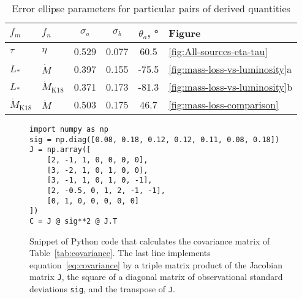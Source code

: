 \documentclass[useAMS, usenatbib, a4paper]{mnras}
\begin{document}
\begin{table}
  \centering
  \caption[Error ellipse]{Error ellipse parameters for particular pairs of derived quantities}
  \label{tab:error-ellipse}
  \begin{tabular}{l l S S S l}
    \toprule
    \(f_m\) & \(f_n\) &  {\(\sigma_a\)} & {\(\sigma_b\)}
    & {\(\theta_a\), \si{\degree}} & Figure   \\
    \midrule
    \(\tau\) & \(\eta\) & 0.529 & 0.077 & 60.5 & \ref{fig:All-sources-eta-tau} \\
    \(L_*\) & \(\dot M\) & 0.397 & 0.155 & -75.5 & \ref{fig:mass-loss-vs-luminosity}a \\
    \(L_*\) & \(\dot M_{\text{K18}}\) & 0.371 & 0.173 & -81.3 & \ref{fig:mass-loss-vs-luminosity}b \\
    \(\dot M_{\text{K18}}\) & \(\dot M\) & 0.503 & 0.175 & 46.7 & \ref{fig:mass-loss-comparison} \\
    \bottomrule
  \end{tabular}
\end{table}


\begin{figure}
  \centering
  \footnotesize
  \begin{verbatim}
import numpy as np
sig = np.diag([0.08, 0.18, 0.12, 0.12, 0.11, 0.08, 0.18])
J = np.array([
    [2, -1, 1, 0, 0, 0, 0],
    [3, -2, 1, 0, 1, 0, 0],
    [3, -1, 1, 0, 1, 0, -1],
    [2, -0.5, 0, 1, 2, -1, -1],
    [0, 1, 0, 0, 0, 0, 0]
])
C = J @ sig**2 @ J.T
  \end{verbatim}
  \vspace*{-\baselineskip}
  \caption{Snippet of Python code that calculates the
    covariance matrix of Table~\ref{tab:covariance}.  The last line
    implements equation~\eqref{eq:covariance} by a triple matrix
    product of the Jacobian matrix \texttt{J}, the square of a
    diagonal matrix of observational standard deviations \texttt{sig},
    and the transpose of \texttt{J}.}
  \label{fig:python-covar}
\end{figure}




\end{document}
